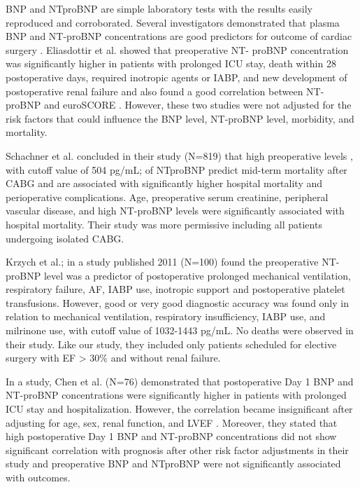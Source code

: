 \documentclass[14pt,a4paper,onecolumn]{extarticle}
\begin{document}
BNP and NTproBNP are simple laboratory tests with the results easily reproduced and corroborated. Several investigators demonstrated that plasma BNP and NT-proBNP concentrations are good predictors for outcome of cardiac surgery \citep{Hutfless2004}. Eliasdottir et al. showed that preoperative NT- proBNP concentration was significantly higher in patients with prolonged ICU stay, death within 28 postoperative days, required inotropic agents or IABP, and new development of postoperative renal failure and also found a good correlation between NT-proBNP and euroSCORE \citep{Eliasdottir2008}.  However, these two studies were not adjusted for the risk factors that could influence the BNP level, NT-proBNP level, morbidity, and mortality.

Schachner et al. concluded in their study (N=819) that high preoperative levels , with cutoff value of 504 pg/mL; of NTproBNP predict mid-term mortality after CABG and are associated with significantly higher hospital mortality and perioperative complications.  Age, preoperative serum creatinine, peripheral vascular disease, and high NT-proBNP levels were significantly associated with hospital mortality.  Their study was more permissive including all patients undergoing isolated CABG. \citep{Schachner2010}

Krzych et al.; in a study published 2011 (N=100) found the preoperative NT-proBNP level was a predictor of postoperative prolonged mechanical ventilation, respiratory failure, AF, IABP use, inotropic support and postoperative platelet transfusions. However, good or very good diagnostic accuracy was found only in relation to mechanical ventilation, respiratory insufficiency, IABP use, and milrinone use, with cutoff value of 1032-1443 pg/mL. No deaths were observed in their study. \citep{Krzych2011}  Like our study, they included only patients scheduled for elective surgery with EF > 30\% and without renal failure.

In a study, Chen et al. (N=76) demonstrated that postoperative Day 1 BNP and NT-proBNP concentrations were significantly higher in patients with prolonged ICU stay and hospitalization. However, the correlation became insignificant after adjusting for age, sex,  renal function, and LVEF \citep{Chen2013}. Moreover, they stated that high postoperative Day 1 BNP and NT-proBNP concentrations did not show significant correlation with prognosis after other risk factor adjustments in their study and preoperative BNP and NTproBNP were not significantly associated with outcomes.
\end{document}
